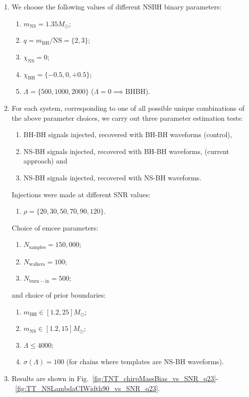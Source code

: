 \documentclass[aps,prd,amsmath,floats,floatfix, twocolumn,
superscriptaddress,nofootinbib,showpacs]{revtex4-1}
\begin{document}
\begin{enumerate}
\item We choose the following values of different NSBH binary parameters:
\begin{enumerate}
\item $m_\mathrm{NS}=1.35M_\odot$;
\item $q=m_\mathrm{BH}/\mathrm{NS}=\{2,3\}$;
\item $\chi_\mathrm{NS}=0$;
\item $\chi_\mathrm{BH}=\{-0.5, 0, +0.5\}$;
\item $\Lambda =\{500,1000,2000\}$ ($\Lambda=0\implies \mathrm{BHBH}$).
\end{enumerate}

\item For each system, corresponding to one of all possible unique combinations
of the above parameter choices, we carry out three parameter estimation tests: 
\begin{enumerate}
\item BH-BH signals injected, recovered with BH-BH waveforms (control),
\item NS-BH signals injected, recovered with BH-BH waveforms, (current approach) and
\item NS-BH signals injected, recovered with NS-BH waveforms.
\end{enumerate}
Injections were made at different SNR values: 
\begin{enumerate}
\item $\rho = \{20, 30, 50, 70, 90, 120\}$.
\end{enumerate}
Choice of emcee parameters:
\begin{enumerate}
\item $N_\mathrm{samples}=150,000$; 
\item $N_\mathrm{walkers}=100$; 
\item $N_\mathrm{burn-in}=500$; 
\end{enumerate}
and choice of prior boundaries:
\begin{enumerate} 
\item $m_\mathrm{BH}\in [1.2, 25]M_\odot$;
\item $m_\mathrm{NS}\in [1.2, 15]M_\odot$;
\item $\Lambda\leq 4000$; 
\item $\sigma\left(\Lambda\right) = 100$ (for chains where templates are NS-BH waveforms).
\end{enumerate}

\item Results are shown in
Fig.~\ref{fig:TNT_chirpMassBias_vs_SNR_q23}-~\ref{fig:TT_NSLambdaCIWidth90_vs_SNR_q23}.

\end{enumerate}
\end{document}
